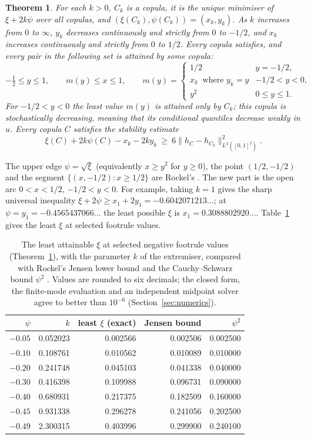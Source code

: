 \documentclass[11pt,a4paper]{article}
\newtheorem{theorem}{Theorem}
\theoremstyle{remark}
\newcommand{\1}{\mathbf 1}
\begin{document}
\begin{theorem}\label{main}
For each $k>0$, $C_k$ is a copula, it is the unique minimiser of $\xi+2k\psi$ over all copulas, and $(\xi(C_k),\psi(C_k))=(x_k,y_k)$. As $k$ increases from $0$ to $\infty$, $y_k$ decreases continuously and strictly from $0$ to $-1/2$, and $x_k$ increases continuously and strictly from $0$ to $1/2$. Every copula satisfies, and every pair in the following set is attained by some copula:
\[
 -\tfrac12\le y\le1,\qquad m(y)\le x\le1,\qquad
 m(y)=\begin{cases}
 1/2 & y=-1/2,\\
 x_k\ \text{ where } y_k=y & -1/2<y<0,\\
 y^2 & 0\le y\le1.
 \end{cases}
\]
For $-1/2<y<0$ the least value $m(y)$ is attained only by $C_k$; this copula is stochastically decreasing, meaning that its conditional quantiles decrease weakly in $u$. Every copula $C$ satisfies the stability estimate
\begin{equation}
 \xi(C)+2k\psi(C)-x_k-2ky_k
 \ \ge\ 6\|h_C-h_{C_k}\|_{L^2([0,1]^2)}^2. \label{stability}
\end{equation}
\end{theorem}
The upper edge $\psi=\sqrt\xi$ (equivalently $x\ge y^2$ for $y\ge0$), the point $(1/2,-1/2)$ and the segment $\{(x,-1/2):x\ge1/2\}$ are Rockel's \cite{rockel}. The new part is the open arc $0<x<1/2$, $-1/2<y<0$. For example, taking $k=1$ gives the sharp universal inequality $\xi+2\psi\ge x_1+2y_1=-0.6042071213\ldots$; at $\psi=y_1=-0.4565437066\ldots$ the least possible $\xi$ is $x_1=0.3088802920\ldots$. Table~\ref{tab:values} gives the least $\xi$ at selected footrule values.

\begin{table}[htbp]
\centering
\caption{The least attainable $\xi$ at selected negative footrule values (Theorem~\ref{main}), with the parameter $k$ of the extremiser, compared with Rockel's Jensen lower bound \cite[Theorem~3.1]{rockel} and the Cauchy--Schwarz bound $\psi^2$ \cite[Corollary~2]{rockel}. Values are rounded to six decimals; the closed form, the finite-mode evaluation and an independent midpoint solver agree to better than $10^{-6}$ (Section~\ref{sec:numerics}).}
\label{tab:values}
\begin{tabular}{rrrrr}
\toprule
$\psi$ & $k$ & least $\xi$ (exact) & Jensen bound & $\psi^2$\\
\midrule
$-0.05$ & 0.052023 & 0.002566 & 0.002506 & 0.002500\\
$-0.10$ & 0.108761 & 0.010562 & 0.010089 & 0.010000\\
$-0.20$ & 0.241748 & 0.045103 & 0.041338 & 0.040000\\
$-0.30$ & 0.416398 & 0.109988 & 0.096731 & 0.090000\\
$-0.40$ & 0.680931 & 0.217375 & 0.182509 & 0.160000\\
$-0.45$ & 0.931338 & 0.296278 & 0.241056 & 0.202500\\
$-0.49$ & 2.300315 & 0.403996 & 0.299900 & 0.240100\\
\bottomrule
\end{tabular}
\end{table}
\end{document}
